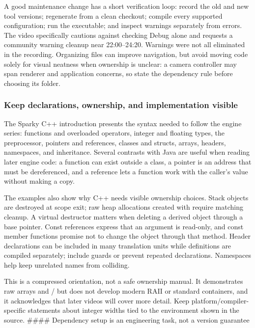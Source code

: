 A good maintenance change has a short verification loop: record the old and new tool versions; regenerate from a clean checkout; compile every supported configuration; run the executable; and inspect warnings separately from errors. The video specifically cautions against checking Debug alone and requests a community warning cleanup near 22:00--24:20. Warnings were not all eliminated in the recording. Organizing files can improve navigation, but avoid moving code solely for visual neatness when ownership is unclear: a camera controller may span renderer and application concerns, so state the dependency rule before choosing its folder.

\subsubsection{Keep declarations, ownership, and implementation visible}\label{05-engine-i-ch013-keep-declarations-ownership-and-implementation-visible}

\hypertarget{05-engine-i-ch013-keep-declarations-ownership-and-implementation-visible}{}

The Sparky C++ introduction presents the syntax needed to follow the engine series: functions and overloaded operators, integer and floating types, the preprocessor, pointers and references, classes and structs, arrays, headers, namespaces, and inheritance. Several contrasts with Java are useful when reading later engine code: a function can exist outside a class, a pointer is an address that must be dereferenced, and a reference lets a function work with the caller's value without making a copy.

The examples also show why C++ needs visible ownership choices. Stack objects are destroyed at scope exit; raw heap allocations created with  require matching cleanup. A virtual destructor matters when deleting a derived object through a base pointer. Const references express that an argument is read-only, and const member functions promise not to change the object through that method. Header declarations can be included in many translation units while  definitions are compiled separately; include guards or  prevent repeated declarations. Namespaces help keep unrelated names from colliding.

This is a compressed orientation, not a safe ownership manual. It demonstrates raw arrays and / but does not develop modern RAII or standard containers, and it acknowledges that later videos will cover more detail. Keep platform/compiler-specific statements about integer widths tied to the environment shown in the source. \#\#\#\# Dependency setup is an engineering task, not a version guarantee

